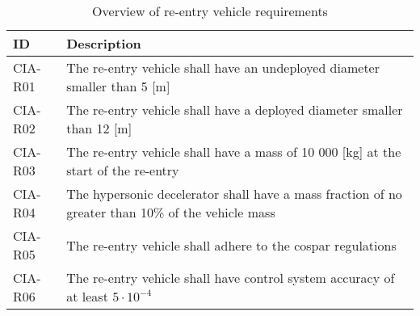 \begin{table}[h]
	\caption{Overview of re-entry vehicle requirements} 
	\begin{tabular}{|p{}|p{}|}
	    \hline
	    ID          & Description                                                                                                      \\ \hline \hline
	CIA-R01 & The re-entry vehicle shall have an undeployed diameter smaller than 5 [m]                         				            \\ \hline
	CIA-R02 & The re-entry vehicle shall have a deployed diameter smaller than 12 [m]                         				            \\ \hline	
	CIA-R03 & The re-entry vehicle shall have a mass of 10 000 [kg] at the start of the re-entry                       				            \\ \hline
	CIA-R04 & The hypersonic decelerator shall have a mass fraction of no greater than 10\% of the vehicle mass  \\ \hline
	CIA-R05 &  The re-entry vehicle shall adhere to the \gls{cospar} regulations \\ \hline
	CIA-R06 &  The re-entry vehicle shall have control system accuracy of at least $5\cdot 10^{-4}$  \\ \hline
	

    \end{tabular}
\end{table}






















